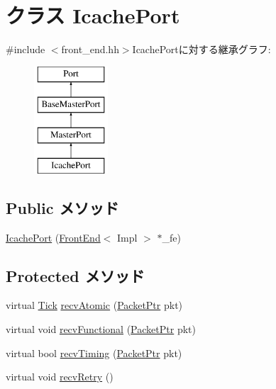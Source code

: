 \hypertarget{classFrontEnd_1_1IcachePort}{
\section{クラス IcachePort}
\label{classFrontEnd_1_1IcachePort}
}


{\ttfamily \#include $<$front\_\-end.hh$>$}IcachePortに対する継承グラフ:\begin{figure}[H]
\begin{center}
\leavevmode
\includegraphics[height=4cm]{classFrontEnd_1_1IcachePort}
\end{center}
\end{figure}
\subsection*{Public メソッド}
\begin{DoxyCompactItemize}
\item 
\hyperlink{classFrontEnd_1_1IcachePort_abd888d3a6cea286340ce6aded692b1cc}{IcachePort} (\hyperlink{classFrontEnd}{FrontEnd}$<$ Impl $>$ $\ast$\_\-fe)
\end{DoxyCompactItemize}
\subsection*{Protected メソッド}
\begin{DoxyCompactItemize}
\item 
virtual \hyperlink{base_2types_8hh_a5c8ed81b7d238c9083e1037ba6d61643}{Tick} \hyperlink{classFrontEnd_1_1IcachePort_a5f0b4c4a94f6b0053f9d7a4eb9c2518a}{recvAtomic} (\hyperlink{classPacket}{PacketPtr} pkt)
\item 
virtual void \hyperlink{classFrontEnd_1_1IcachePort_aeefa907fb6d6a787e6dab90e8138ea90}{recvFunctional} (\hyperlink{classPacket}{PacketPtr} pkt)
\item 
virtual bool \hyperlink{classFrontEnd_1_1IcachePort_aaeef0f6f81d00988bb7b8ba8fe56049e}{recvTiming} (\hyperlink{classPacket}{PacketPtr} pkt)
\item 
virtual void \hyperlink{classFrontEnd_1_1IcachePort_a29cb5a4f98063ce6e9210eacbdb35298}{recvRetry} ()
\end{DoxyCompactItemize}
